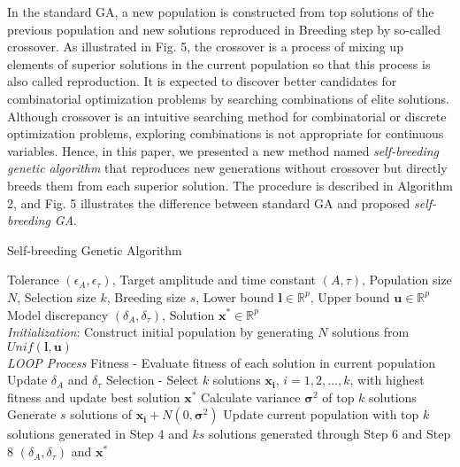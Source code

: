 \documentclass[journal]{IEEEtran}
\begin{document}
In the standard GA, a new population is constructed from top solutions of the previous population and new solutions reproduced in Breeding step by so-called crossover. As illustrated in Fig. 5, the crossover is a process of mixing up elements of superior solutions in the current population so that this process is also called reproduction. It is expected to discover better candidates for combinatorial optimization problems by searching combinations of elite solutions. Although crossover is an intuitive searching method for combinatorial or discrete optimization problems, exploring combinations is not appropriate for continuous variables. Hence, in this paper, we presented a new method named \textit{self-breeding genetic algorithm} that reproduces new generations without crossover but directly breeds them from each superior solution. The procedure is described in Algorithm 2, and Fig. 5 illustrates the difference between standard GA and proposed \textit{self-breeding GA}.
\begin{algorithm}
    \caption{Self-breeding Genetic Algorithm}
    \begin{algorithmic}[1-=0+-*]
        \renewcommand{\algorithmicrequire}{\textbf{Input:}}
        \renewcommand{\algorithmicensure}{\textbf{Output:}}
        \REQUIRE Tolerance $(\epsilon_{A}, \epsilon_{\tau})$, Target amplitude and time constant $(A, \tau)$, Population size $N$, Selection size $k$, Breeding size $s$, Lower bound $\mathbf{l} \in \mathbb{R}^p$, Upper bound $\mathbf{u} \in \mathbb{R}^p$
        \ENSURE Model discrepancy $(\delta_{A}, \delta_{\tau})$, Solution $\mathbf{x}^* \in \mathbb{R}^p$
        \\ \textit{Initialization}:
        \STATE Construct initial population by generating $N$ solutions from $Unif(\mathbf{l}, \mathbf{u})$
        \\ \textit{LOOP Process}
        \STATE Fitness - Evaluate fitness of each solution in current population        
        \STATE Update $\delta_{A}$ and $\delta_{\tau}$
        \STATE Selection - Select $k$ solutions $\mathbf{x_i}$, $i=1,2,...,k$, with highest fitness and update best solution $\mathbf{x^{*}}$
        \STATE Calculate variance $\mathbf{\sigma}^2$ of top $k$ solutions
            \STATE Generate $s$ solutions of $\mathbf{x_i} + N(0,\mathbf{\sigma}^2)$
        \ENDFOR
        \STATE Update current population with top $k$ solutions generated in Step 4 and $ks$ solutions generated through Step 6 and Step 8
        \ENDWHILE
        \RETURN $(\delta_{A}, \delta_{\tau})$ and $\mathbf{x}^*$
    \end{algorithmic} 
\end{algorithm}
\end{document}
